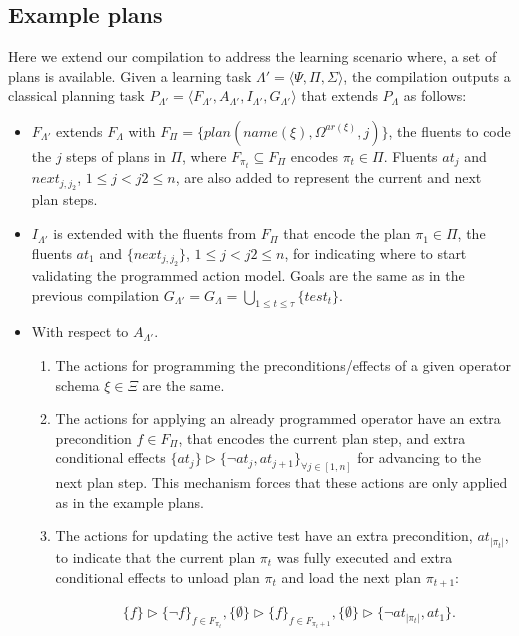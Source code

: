 \documentclass[letterpaper]{article} %
\newcommand{\tup}[1]{{\langle #1 \rangle}}
\begin{document}
\subsection{Example plans}
Here  we extend our compilation to address the learning scenario where, a set of plans is available. Given a learning task $\Lambda'=\tup{\Psi,\Pi,\Sigma}$, the compilation outputs a classical planning task $P_{\Lambda'}=\tup{F_{\Lambda'},A_{\Lambda'},I_{\Lambda'},G_{\Lambda'}}$ that extends $P_{\Lambda}$ as follows:
\begin{itemize}
\item $F_{\Lambda'}$ extends $F_{\Lambda}$ with $F_{\Pi}=\{plan(name(\xi),\Omega^{ar(\xi)},j)\}$, the fluents to code the $j$ steps of plans in $\Pi$, where $F_{\pi_t}\subseteq F_{\Pi}$ encodes $\pi_t\in \Pi$. Fluents $at_j$ and $next_{j,j_2}$, {\small $1\leq j<j2\leq n$}, are also added to represent the current and next plan steps.
\item $I_{\Lambda'}$ is extended with the fluents from $F_{\Pi}$ that encode the plan $\pi_1\in \Pi$, the fluents $at_1$ and $\{next_{j,j_2}\}$, {\small $1\leq j<j2\leq n$}, for indicating where to start validating the programmed action model. Goals are the same as in the previous compilation $G_{\Lambda'}=G_{\Lambda}=\bigcup_{1\leq t\leq \tau}\{test_t\}$.
\item With respect to $A_{\Lambda'}$.
\begin{enumerate}
\item The actions for programming the preconditions/effects of a given operator schema $\xi\in\Xi$ are the same.
\item The actions for applying an already programmed operator have an extra precondition $f\in F_{\Pi}$, that encodes the current plan step, and extra conditional effects $\{at_{j}\}\rhd\{\neg at_{j},at_{j+1}\}_{\forall j\in [1,n]}$ for advancing to the next plan step. This mechanism forces that these actions are only applied as in the example plans.
\item The actions for updating the active test have an extra precondition, $at_{|\pi_t|}$, to indicate that the current plan $\pi_t$ was fully executed and extra conditional effects to unload plan $\pi_{t}$ and load the next plan $\pi_{t+1}$:
\begin{small}
\begin{align*}
&\{f\}\rhd\{\neg f\}_{f\in F_{\pi_t}}, \{\emptyset\}\rhd\{f\}_{f\in F_{\pi_t+1}},\{\emptyset\}\rhd\{\neg at_{|\pi_t|},at_1\}.
\end{align*}
\end{small}
\end{enumerate}
\end{itemize}
\end{document}
